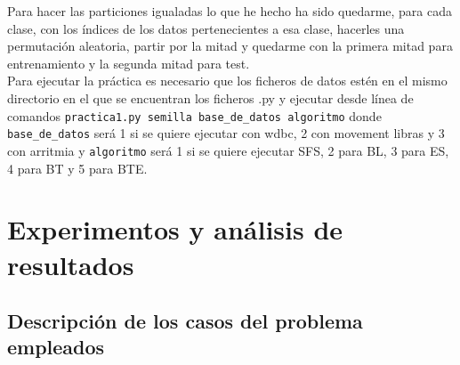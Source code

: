 \documentclass[12pt]{article}
\begin{document}
Para hacer las particiones igualadas lo que he hecho ha sido quedarme, para cada clase, con los índices de los datos pertenecientes a esa clase, hacerles una permutación aleatoria, partir por la mitad y quedarme con la primera mitad para entrenamiento y la segunda mitad para test.\\

Para ejecutar la práctica es necesario que los ficheros de datos estén en el mismo directorio en el que se encuentran los ficheros .py y ejecutar desde línea de comandos \texttt{practica1.py semilla base\_de\_datos algoritmo} donde \texttt{base\_de\_datos} será 1 si se quiere ejecutar con wdbc, 2 con movement libras y 3 con arritmia y \texttt{algoritmo} será 1 si se quiere ejecutar SFS, 2 para BL, 3 para ES, 4 para BT y 5 para BTE.

\newpage

\section{Experimentos y análisis de resultados}
\subsection{Descripción de los casos del problema empleados}
\end{document}
